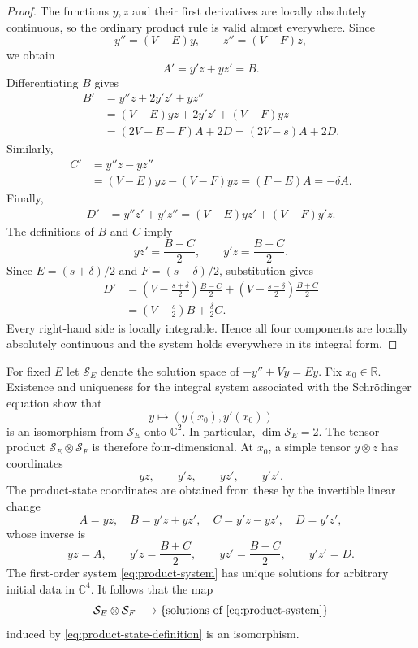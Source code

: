 \documentclass[11pt]{amsart}
\numberwithin{equation}{section}
\theoremstyle{remark}
\newcommand{\R}{\mathbb R}
\newcommand{\C}{\mathbb C}
\newcommand{\Sc}{\mathcal S}
\begin{document}
\begin{proof}
The functions $y,z$ and their first derivatives are locally absolutely
continuous, so the ordinary product rule is valid almost everywhere.  Since
\[
 y''=(V-E)y,
 \qquad z''=(V-F)z,
\]
we obtain
\[
 A'=y'z+yz'=B.
\]
Differentiating $B$ gives
\begin{align*}
 B'
 &=y''z+2y'z'+yz''\\
 &=(V-E)yz+2y'z'+(V-F)yz\\
 &=(2V-E-F)A+2D=(2V-s)A+2D.
\end{align*}
Similarly,
\begin{align*}
 C'
 &=y''z-yz''\\
 &=(V-E)yz-(V-F)yz=(F-E)A=-\delta A.
\end{align*}
Finally,
\begin{align*}
 D'
 &=y''z'+y'z''=(V-E)yz'+(V-F)y'z.
\end{align*}
The definitions of $B$ and $C$ imply
\[
 yz'=\frac{B-C}{2},
 \qquad y'z=\frac{B+C}{2}.
\]
Since $E=(s+\delta)/2$ and $F=(s-\delta)/2$, substitution gives
\begin{align*}
 D'
 &=\left(V-\frac{s+\delta}{2}\right)\frac{B-C}{2}
   +\left(V-\frac{s-\delta}{2}\right)\frac{B+C}{2}\\
 &=\left(V-\frac{s}{2}\right)B+\frac{\delta}{2}C.
\end{align*}
Every right-hand side is locally integrable.  Hence all four components are
locally absolutely continuous and the system holds everywhere in its
integral form.
\end{proof}

For fixed $E$ let $\Sc_E$ denote the solution space of
$-y''+Vy=Ey$.  Fix $x_0\in\R$.  Existence and uniqueness for the integral
system associated with the Schr\"odinger equation show that
\[
 y\longmapsto (y(x_0),y'(x_0))
\]
is an isomorphism from $\Sc_E$ onto $\C^2$.  In particular,
$\dim\Sc_E=2$.  The tensor product $\Sc_E\otimes\Sc_F$ is therefore
four-dimensional.  At $x_0$, a simple tensor $y\otimes z$ has coordinates
\[
 yz,\qquad y'z,\qquad yz',\qquad y'z'.
\]
The product-state coordinates are obtained from these by the invertible
linear change
\[
 A=yz,
 \quad B=y'z+yz',
 \quad C=y'z-yz',
 \quad D=y'z',
\]
whose inverse is
\[
 yz=A,
 \qquad y'z=\frac{B+C}{2},
 \qquad yz'=\frac{B-C}{2},
 \qquad y'z'=D.
\]
The first-order system \eqref{eq:product-system} has unique solutions for
arbitrary initial data in $\C^4$.  It follows that the map
\begin{equation}
 \Sc_E\otimes\Sc_F
 \longrightarrow
 \{\text{solutions of \eqref{eq:product-system}}\}
 \label{eq:tensor-identification}
\end{equation}
induced by \eqref{eq:product-state-definition} is an isomorphism.
\end{document}
